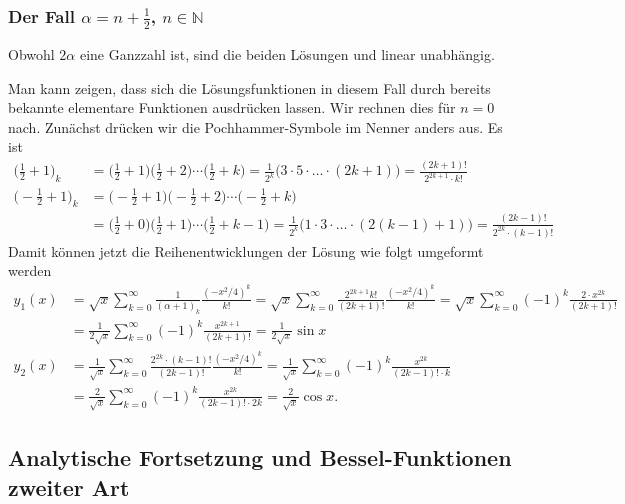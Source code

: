 \subsubsection{Der Fall $\alpha=n+\frac12$, $n\in\mathbb{N}$}
Obwohl $2\alpha$ eine Ganzzahl ist, sind die beiden Lösungen
\label{buch:differentialgleichunge:bessel:erste}
und
\label{buch:differentialgleichunge:bessel:zweite}
linear unabhängig.

Man kann zeigen, dass sich die Lösungsfunktionen in diesem Fall
durch bereits bekannte elementare Funktionen ausdrücken lassen.
Wir rechnen dies für $n=0$ nach.
Zunächst drücken wir die Pochhammer-Symbole im Nenner anders aus.
Es ist
\begin{align*}
\biggl(\frac12 + 1\biggr)_k
&=
\biggl(\frac12 + 1\biggr)
\biggl(\frac12 + 2\biggr)
\cdots
\biggl(\frac12 + k\biggr)
=
\frac{1}{2^k}\bigl(3\cdot 5\cdot\ldots\cdot (2k+1)\bigr)
=
\frac{(2k+1)!}{2^{2k+1}\cdot k!}
\\
\biggl(-\frac12 + 1\biggr)_k
&=
\biggl(-\frac12 + 1\biggr)
\biggl(-\frac12 + 2\biggr)
\cdots
\biggl(-\frac12 + k\biggr)
\\
&=
\biggl(\frac12 + 0\biggr)
\biggl(\frac12 + 1\biggr)
\cdots
\biggl(\frac12 + k-1\biggr)
=
\frac{1}{2^k}\bigl(1\cdot 3 \cdot\ldots\cdot (2(k-1)+1)\bigr)
=
\frac{(2k-1)!}{2^{2k}\cdot (k-1)!}
\end{align*}
Damit können jetzt die Reihenentwicklungen der Lösung wie folgt
umgeformt werden
\begin{align*}
y_1(x)
&=
\sqrt{x}
\sum_{k=0}^\infty
\frac{1}{(\alpha+1)_k}
\frac{(-x^2/4)^k}{k!}
=
\sqrt{x}
\sum_{k=0}^\infty
\frac{2^{2k+1}k!}{(2k+1)!}
\frac{(-x^2/4)^k}{k!}
=
\sqrt{x}
\sum_{k=0}^\infty
(-1)^k
\frac{2\cdot x^{2k}}{(2k+1)!}
\\
&=
\frac{1}{2\sqrt{x}}
\sum_{k=0}^\infty
(-1)^k
\frac{x^{2k+1}}{(2k+1)!}
=
\frac{1}{2\sqrt{x}} \sin x
\\
y_2(x)
&=
\frac{1}{\sqrt{x}}
\sum_{k=0}^\infty
\frac{2^{2k}\cdot (k-1)!}{(2k-1)!}
\frac{(-x^2/4)^k}{k!}
=
\frac{1}{\sqrt{x}}
\sum_{k=0}^\infty
(-1)^k
\frac{x^{2k}}{(2k-1)!\cdot k}
\\
&=
\frac{2}{\sqrt{x}}
\sum_{k=0}^\infty
(-1)^k
\frac{x^{2k}}{(2k-1)!\cdot 2k}
=
\frac{2}{\sqrt{x}} \cos x.
\end{align*}


\subsection{Analytische Fortsetzung und Bessel-Funktionen zweiter Art}





